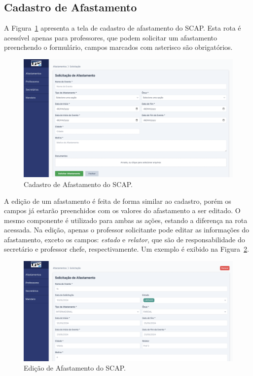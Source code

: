 \FloatBarrier

\subsection{Cadastro de Afastamento}
\label{subsec-projeto-cadastro-afastamento}

A Figura~\ref{fig-cadastro-afastamento} apresenta a tela de cadastro de afastamento do SCAP. Esta rota
é acessível apenas para professores, que podem solicitar um afastamento preenchendo o formulário,
campos marcados com asterisco são obrigatórios. 

\begin{figure}[h!]
    \centering
    \includegraphics[width=\textwidth]{figuras/prints-app/fig-solicitar-afastamento.png}
    \caption{Cadastro de Afastamento do SCAP.}
    \label{fig-cadastro-afastamento}
\end{figure}

A edição de um afastamento é feita de forma similar ao cadastro, porém os campos já estarão preenchidos com os valores
do afastamento a ser editado. O mesmo componente é utilizado para ambas as ações, estando a diferença na rota acessada.
Na edição, apenas o professor solicitante pode editar as informações do afastamento, exceto os campos:
\textit{estado} e \textit{relator}, que são de responsabilidade do secretário e professor chefe, respectivamente. Um exemplo é exibido na Figura~\ref{fig-editar-afastamento}.

\begin{figure}
    \centering
    \includegraphics[width=\textwidth]{figuras/prints-app/fig-editar-afastamento.png}
    \caption{Edição de Afastamento do SCAP.}
    \label{fig-editar-afastamento}
\end{figure}

